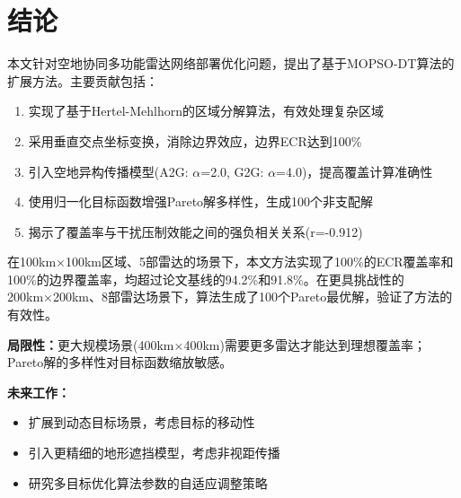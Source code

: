 \section{结论}
\label{sec:conclusion}

本文针对空地协同多功能雷达网络部署优化问题，提出了基于MOPSO-DT算法的扩展方法。主要贡献包括：

\begin{enumerate}
    \item 实现了基于Hertel-Mehlhorn的区域分解算法，有效处理复杂区域
    \item 采用垂直交点坐标变换，消除边界效应，边界ECR达到100\%
    \item 引入空地异构传播模型(A2G: $\alpha$=2.0, G2G: $\alpha$=4.0)，提高覆盖计算准确性
    \item 使用归一化目标函数增强Pareto解多样性，生成100个非支配解
    \item 揭示了覆盖率与干扰压制效能之间的强负相关关系(r=-0.912)
\end{enumerate}

在100km×100km区域、5部雷达的场景下，本文方法实现了100\%的ECR覆盖率和100\%的边界覆盖率，均超过论文基线的94.2\%和91.8\%。在更具挑战性的200km×200km、8部雷达场景下，算法生成了100个Pareto最优解，验证了方法的有效性。

\textbf{局限性：}更大规模场景(400km×400km)需要更多雷达才能达到理想覆盖率；Pareto解的多样性对目标函数缩放敏感。

\textbf{未来工作：}
\begin{itemize}
    \item 扩展到动态目标场景，考虑目标的移动性
    \item 引入更精细的地形遮挡模型，考虑非视距传播
    \item 研究多目标优化算法参数的自适应调整策略
\end{itemize}